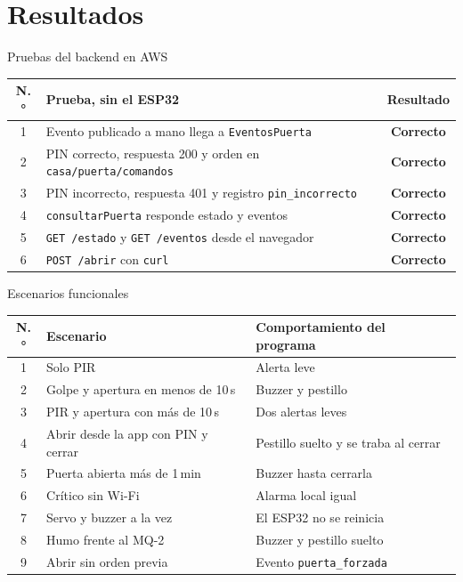 \documentclass[aspectratio=169,10pt]{beamer}
\begin{document}
\section{Resultados}

\begin{frame}{Pruebas del backend en AWS}
  \small
  \renewcommand{\arraystretch}{1.25}
  \centering
  \begin{tabular}{@{}cl c@{}}
    \toprule
    \textbf{N.°} & \textbf{Prueba, sin el ESP32} & \textbf{Resultado} \\
    \midrule
    1 & Evento publicado a mano llega a \texttt{EventosPuerta} & \textcolor{cAct}{\textbf{Correcto}} \\
    2 & PIN correcto, respuesta 200 y orden en \texttt{casa/puerta/comandos} & \textcolor{cAct}{\textbf{Correcto}} \\
    3 & PIN incorrecto, respuesta 401 y registro \texttt{pin\_incorrecto} & \textcolor{cAct}{\textbf{Correcto}} \\
    4 & \texttt{consultarPuerta} responde estado y eventos & \textcolor{cAct}{\textbf{Correcto}} \\
    5 & \texttt{GET /estado} y \texttt{GET /eventos} desde el navegador & \textcolor{cAct}{\textbf{Correcto}} \\
    6 & \texttt{POST /abrir} con \texttt{curl} & \textcolor{cAct}{\textbf{Correcto}} \\
    \bottomrule
  \end{tabular}
\end{frame}

\begin{frame}{Escenarios funcionales}
  \small
  \renewcommand{\arraystretch}{1.1}
  \centering
  \begin{tabular}{@{}cl>{\raggedright\arraybackslash}p{5.2cm}@{}}
    \toprule
    \textbf{N.°} & \textbf{Escenario} & \textbf{Comportamiento del programa} \\
    \midrule
    1 & Solo PIR & Alerta leve \\
    2 & Golpe y apertura en menos de 10\,s & Buzzer y pestillo \\
    3 & PIR y apertura con más de 10\,s & Dos alertas leves \\
    4 & Abrir desde la app con PIN y cerrar & Pestillo suelto y se traba al cerrar \\
    5 & Puerta abierta más de 1\,min & Buzzer hasta cerrarla \\
    6 & Crítico sin Wi-Fi & Alarma local igual \\
    7 & Servo y buzzer a la vez & El ESP32 no se reinicia \\
    8 & Humo frente al MQ-2 & Buzzer y pestillo suelto \\
    9 & Abrir sin orden previa & Evento \texttt{puerta\_forzada} \\
    \bottomrule
  \end{tabular}
\end{frame}
\end{document}
